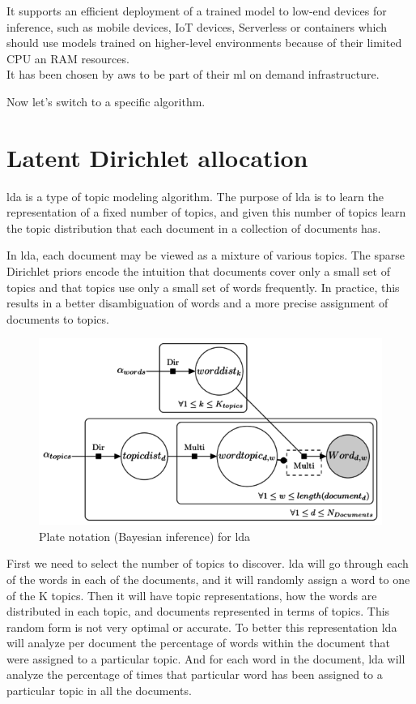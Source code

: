 \documentclass[thesis=M,english]{FITthesis}[2012/06/26]
\begin{document}
It supports an efficient deployment of a trained model to low-end devices for inference, such as mobile devices, IoT devices, Serverless or containers which should use models trained on higher-level environments because of their limited CPU an RAM resources.\\

It has been chosen by \acrshort{aws} to be part of their \acrshort{ml} on demand infrastructure.

Now let's switch to a specific algorithm.

\section{Latent Dirichlet allocation}\label{lda_algotithm}

\acrshort{lda}\cite{ml_lda} is a type of topic modeling algorithm. The purpose of \acrshort{lda} is to learn the representation of a fixed number of topics, and given this number of topics learn the topic distribution that each document in a collection of documents has.

In \acrshort{lda}, each document may be viewed as a mixture of various topics. The sparse Dirichlet priors encode the intuition that documents cover only a small set of topics and that topics use only a small set of words frequently. In practice, this results in a better disambiguation of words and a more precise assignment of documents to topics. 

\begin{figure}[h!]\centering
	\includegraphics[width=1\textwidth]{pictures/ml_lda_scheme}
	\caption{Plate notation (Bayesian inference) for \acrshort{lda} \cite{ml_lda_exmplanation}}\label{fig:ml_lda_scheme}
\end{figure}

First we need to select the number of topics to discover. \acrshort{lda} will go through each of the words in each of the documents, and it will randomly assign a word to one of the K topics. Then it will have topic representations, how the words are distributed in each topic, and documents represented in terms of topics. This random form is not very optimal or accurate. To better this representation \acrshort{lda} will analyze per document the percentage of words within the document that were assigned to a particular topic. And for each word in the document, \acrshort{lda} will analyze the percentage of times that particular word has been assigned to a particular topic in all the documents. 
\end{document}
